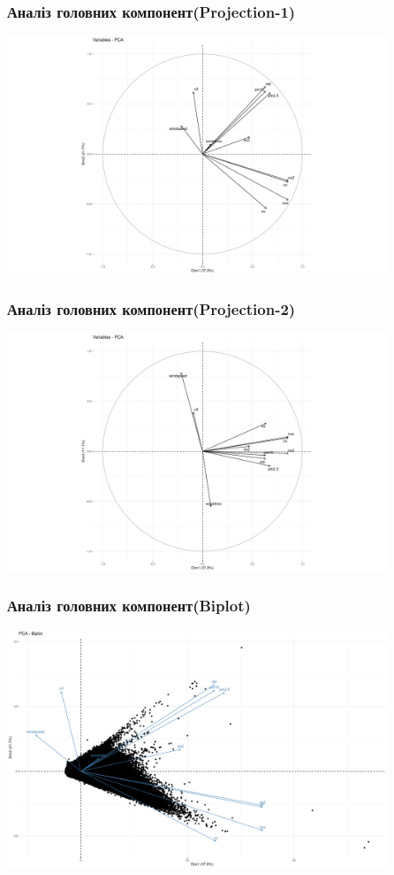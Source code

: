 \documentclass{beamer}
\begin{document}
\begin{frame}
\frametitle{Аналіз головних компонент(Projection-1)}
  \includegraphics[height=2.8in]{plots/lab4/pca/projection-1-2.png}
\end{frame}

\begin{frame}
\frametitle{Аналіз головних компонент(Projection-2)}
  \includegraphics[height=2.8in]{plots/lab4/pca/projection-1-3.png}
\end{frame}

\begin{frame}
\frametitle{Аналіз головних компонент(Biplot)}
  \includegraphics[height=2.8in]{plots/lab4/pca/biplot.png}
\end{frame}
\end{document}
